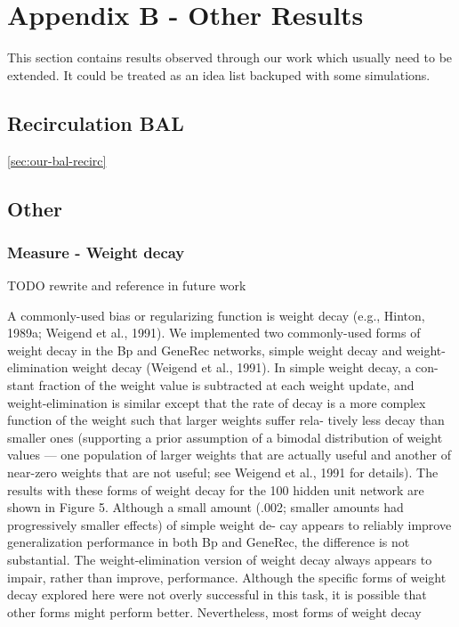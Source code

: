 
\section*{Appendix B - Other Results}
\appendix
{}
\label{sec:appendix-results}

This section contains results observed through our work which usually need to be extended. It could be treated as an idea list backuped with some simulations. 

\subsection{Recirculation BAL}
\ref{sec:our-bal-recirc}

\subsection{Other} 

\subsubsection{Measure - Weight decay}
\label{sec:weight-decay} 
TODO rewrite and reference in future work

A commonly-used bias or regularizing function is weight decay (e.g., Hinton, 1989a; Weigend et al., 1991).
We implemented two commonly-used forms of weight decay in the Bp and GeneRec networks, simple
weight decay and weight-elimination weight decay (Weigend et al., 1991). In simple weight decay, a con-
stant fraction of the weight value is subtracted at each weight update, and weight-elimination is similar
except that the rate of decay is a more complex function of the weight such that larger weights suffer rela-
tively less decay than smaller ones (supporting a prior assumption of a bimodal distribution of weight values
— one population of larger weights that are actually useful and another of near-zero weights that are not
useful; see Weigend et al., 1991 for details).
The results with these forms of weight decay for the 100 hidden unit network are shown in Figure 5.
Although a small amount (.002; smaller amounts had progressively smaller effects) of simple weight de-
cay appears to reliably improve generalization performance in both Bp and GeneRec, the difference is not
substantial. The weight-elimination version of weight decay always appears to impair, rather than improve,
performance. Although the specific forms of weight decay explored here were not overly successful in
this task, it is possible that other forms might perform better. Nevertheless, most forms of weight decay
\citet{o2001generalization} 


